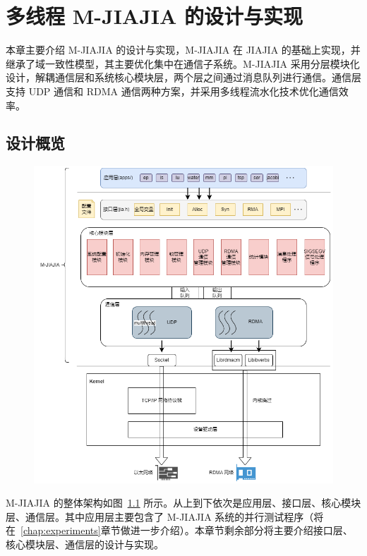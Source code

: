 \chapter{多线程 M-JIAJIA 的设计与实现}\label{chap:MJIAJIA}{
本章主要介绍 M-JIAJIA 的设计与实现，M-JIAJIA 在 JIAJIA 的基础上实现，并继承了域一致性模型，其主要优化集中在通信子系统。M-JIAJIA 采用分层模块化设计，解耦通信层和系统核心模块层，两个层之间通过消息队列进行通信。通信层支持 UDP 通信和 RDMA 通信两种方案，并采用多线程流水化技术优化通信效率。

\section{设计概览}
\begin{figure}[!htbp]
    \centering
    \includegraphics[width=\textwidth]{Img/system-arch.png}
    \label{fig:system-arch}
\end{figure}
M-JIAJIA 的整体架构如图~\ref{fig:system-arch} 所示。从上到下依次是应用层、接口层、核心模块层、通信层。其中应用层主要包含了 M-JIAJIA 系统的并行测试程序（将在~\ref{chap:experiments}章节做进一步介绍）。本章节剩余部分将主要介绍接口层、核心模块层、通信层的设计与实现。

}
